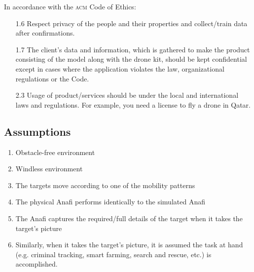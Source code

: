 \documentclass[../main.tex]{subfiles}
\begin{document}
\noindent
In accordance with the \textsc{acm} Code of Ethics:
\begin{itemize}
    \item[1.6] Respect privacy of the people and their 
        properties and collect/train data after confirmations.
    \item[1.7] The client's data and information, which is gathered 
        to make the product consisting of the model along with 
        the drone kit, should be kept confidential except in cases 
        where the application violates the law, 
        organizational regulations or the Code.
    \item[2.3] Usage of product/services should be under 
        the local and international laws and regulations. 
        For example, you need a license to fly a drone in Qatar.
\end{itemize}

\subsection{Assumptions}

\begin{enumerate}
    \item Obstacle-free environment
    \item Windless environment
    \item The targets move according to one of the mobility patterns
    \item The physical Anafi performs identically to the simulated Anafi
    \item The Anafi captures the required/full details of the target 
        when it takes the target’s picture
    \item Similarly, when it takes the target’s picture, 
        it is assumed the task at hand 
        (e.g. criminal tracking, smart farming, search and rescue, etc.) 
        is accomplished.
\end{enumerate}
\end{document}
